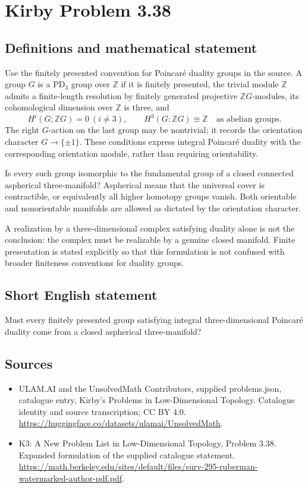 \documentclass[11pt,a4paper]{article}
\begin{document}
\section*{Kirby Problem 3.38}\label{statement}

\subsection{Definitions and mathematical statement}
Use the finitely presented convention for Poincaré duality groups in the
source. A group $G$ is a $\mathrm{PD}_3$ group over $\mathbb Z$ if it is
finitely presented, the trivial module $\mathbb Z$ admits a finite-length
resolution by finitely generated projective $\mathbb ZG$-modules,
its cohomological dimension over $\mathbb Z$ is three, and
\[
 H^i(G;\mathbb ZG)=0\ (i\ne3),\qquad
 H^3(G;\mathbb ZG)\cong\mathbb Z
 \quad\text{as abelian groups}.
\]
The right $G$-action on the last group may be nontrivial; it records the
orientation character $G\to\{\pm1\}$. These conditions express integral
Poincaré duality with the corresponding orientation module, rather than
requiring orientability.

Is every such group isomorphic to the fundamental group of a closed
connected aspherical three-manifold? Aspherical means that the universal
cover is contractible, or equivalently all higher homotopy groups vanish.
Both orientable and nonorientable manifolds are allowed as dictated by the
orientation character.

A realization by a three-dimensional complex satisfying duality alone is
not the conclusion: the complex must be realizable by a genuine closed
manifold. Finite presentation is stated explicitly so that this formulation
is not confused with broader finiteness conventions for duality groups.
\subsection{Short English statement}
Must every finitely presented group satisfying integral three-dimensional Poincaré duality come from a closed aspherical three-manifold?
\subsection{Sources}
\begin{itemize}
\item[S1] ULAM.AI and the UnsolvedMath Contributors, supplied problems.json, catalogue entry, Kirby's Problems in Low-Dimensional Topology. Catalogue identity and source transcription; CC BY 4.0.
\url{https://huggingface.co/datasets/ulamai/UnsolvedMath}.
\item[S2] K3: A New Problem List in Low-Dimensional Topology, Problem 3.38. Expanded formulation of the supplied catalogue statement.
\url{https://math.berkeley.edu/sites/default/files/surv-295-ruberman-watermarked-author-pdf.pdf}.
\end{itemize}
\end{document}
